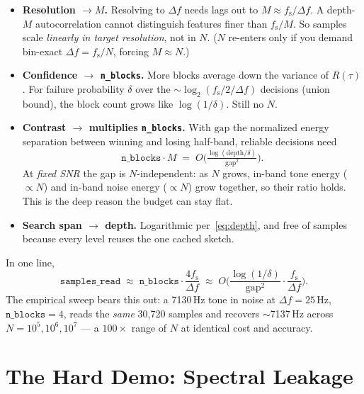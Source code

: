 \documentclass[11pt]{article}
\newcommand{\R}{R}
\newcommand{\fs}{f_{\mathrm{s}}}
\begin{document}
\begin{itemize}
  \item \textbf{Resolution $\to M$.} Resolving to $\Delta f$ needs lags out to
        $M\approx \fs/\Delta f$. A depth-$M$ autocorrelation cannot distinguish
        features finer than $\fs/M$. So samples scale \emph{linearly in target
        resolution}, not in $N$. ($N$ re-enters only if you demand bin-exact
        $\Delta f = \fs/N$, forcing $M\approx N$.)
  \item \textbf{Confidence $\to$ \texttt{n\_blocks}.} More blocks average down the
        variance of $\R(\tau)$. For failure probability $\delta$ over the
        $\sim\log_2(\fs/2/\Delta f)$ decisions (union bound), the block count
        grows like $\log(1/\delta)$. Still no $N$.
  \item \textbf{Contrast $\to$ multiplies \texttt{n\_blocks}.} With $\mathrm{gap}$
        the normalized energy separation between winning and losing half-band,
        reliable decisions need
        \begin{equation}
          \texttt{n\_blocks}\cdot M
            \;=\; O\!\Big(\tfrac{\log(\text{depth}/\delta)}{\mathrm{gap}^2}\Big).
        \end{equation}
        At \emph{fixed SNR} the gap is $N$-independent: as $N$ grows, in-band tone
        energy ($\propto N$) and in-band noise energy ($\propto N$) grow together,
        so their ratio holds. This is the deep reason the budget can stay flat.
  \item \textbf{Search span $\to$ depth.} Logarithmic per~\eqref{eq:depth}, and
        free of samples because every level reuses the one cached sketch.
\end{itemize}

In one line,
\begin{equation}
  \texttt{samples\_read}
    \;\approx\; \texttt{n\_blocks}\cdot\frac{4\fs}{\Delta f}
    \;\approx\; O\!\Big(\frac{\log(1/\delta)}{\mathrm{gap}^2}\cdot\frac{\fs}{\Delta f}\Big).
\end{equation}
The empirical sweep bears this out: a 7130\,Hz tone in noise at
$\Delta f=25$\,Hz, $\texttt{n\_blocks}=4$, reads the \emph{same} 30{,}720 samples
and recovers $\sim$7137\,Hz across $N=10^5,10^6,10^7$ --- a $100\times$ range of
$N$ at identical cost and accuracy.

\section{The Hard Demo: Spectral Leakage}
\end{document}
